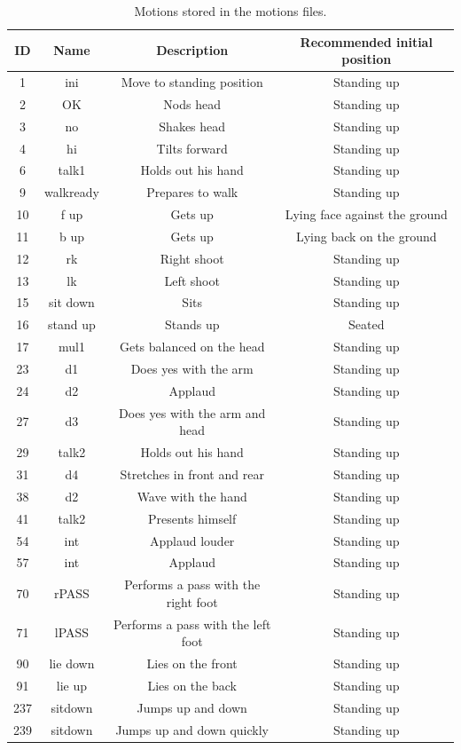 \documentclass[a4paper, 12pt]{article}  		%
\begin{document}
\begin{table}[H]
\begin{center}
\begin{tabular}{ | c | c | c | c | }

\hline
ID & Name & Description & Recommended initial position \\ 
\hline
\hline
1 & ini & Move to standing position & Standing up \\
\hline
2 & OK & Nods head & Standing up \\
\hline
3 & no & Shakes head & Standing up \\
\hline
4 & hi & Tilts forward & Standing up \\
\hline
6 & talk1 & Holds out his hand & Standing up \\
\hline
9 & walkready & Prepares to walk & Standing up \\
\hline
10 & f up & Gets up & Lying face against the ground \\
\hline
11 & b up & Gets up & Lying back on the ground \\
\hline
12 & rk & Right shoot & Standing up \\
\hline
13 & lk & Left shoot & Standing up \\
\hline
15 & sit down & Sits & Standing up \\
\hline
16 & stand up & Stands up & Seated \\
\hline
17 & mul1 & Gets balanced on the head & Standing up \\
\hline
23 & d1 & Does yes with the arm & Standing up \\
\hline
24 & d2 & Applaud & Standing up \\
\hline
27 & d3 & Does yes with the arm and head & Standing up \\
\hline
29 & talk2 & Holds out his hand & Standing up \\
\hline
31 & d4 & Stretches in front and rear & Standing up \\
\hline
38 & d2 & Wave with the hand & Standing up \\
\hline
41 & talk2 & Presents himself & Standing up \\
\hline
54 & int & Applaud louder & Standing up \\
\hline
57 & int & Applaud & Standing up \\
\hline
70 & rPASS & Performs a pass with the right foot & Standing up \\
\hline
71 & lPASS & Performs a pass with the left foot & Standing up \\
\hline
90 & lie down & Lies on the front & Standing up \\
\hline
91 & lie up & Lies on the back & Standing up \\
\hline
237 & sitdown & Jumps up and down & Standing up \\
\hline
239 & sitdown & Jumps up and down quickly & Standing up \\
\hline
\end{tabular}
\caption{Motions stored in the motions files.}
\label{tab::Motions}
\end{center}
\end{table}
\end{document}
